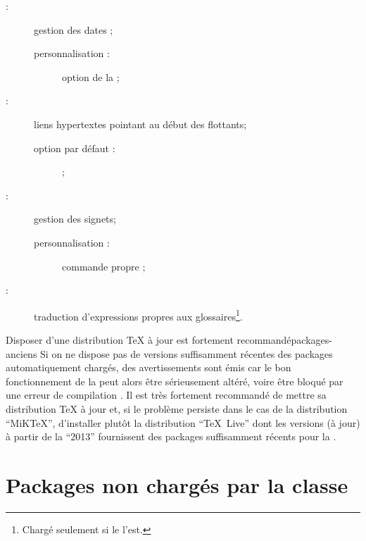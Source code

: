 \begin{description}
\item[ :] gestion des dates ;
  \begin{description}
  \item[personnalisation :] option  de la \yatcl ;
  \end{description}
\item[ :] liens hypertextes pointant au début des
  flottants\ifscreenoutput ;
  \begin{description}
  \item[option par défaut :]  ;
  \end{description}
\item[ :] gestion des signets\ifscreenoutput ;
  \begin{description}
  \item[personnalisation :] commande propre  ;
  \end{description}
\item[ :] traduction d'expressions propres aux
  glossaires\footnote{Chargé seulement si le  l'est.}.
\end{description}

\begin{dbremark}{Disposer d'une distribution \TeX{} à jour est fortement
    recommandé}{packages-anciens}
  Si on ne dispose pas de versions suffisamment récentes des packages
  automatiquement chargés, des avertissements sont émis car le bon
  fonctionnement de la \yatcl{} peut alors être sérieusement altéré, voire être
  bloqué par une erreur de compilation . Il
  est très fortement recommandé de mettre sa distribution \TeX{} à jour et, si
  le problème persiste dans le cas de la distribution \enquote{MiK\TeX{}},
  d'installer plutôt la distribution \enquote{\TeX~Live} dont les versions (à
  jour) à partir de la \enquote{2013} fournissent des packages suffisamment
  récents pour la \yatcl.
\end{dbremark}

\section{Packages non  chargés par la classe}\label{sec:packages-non-charges}

